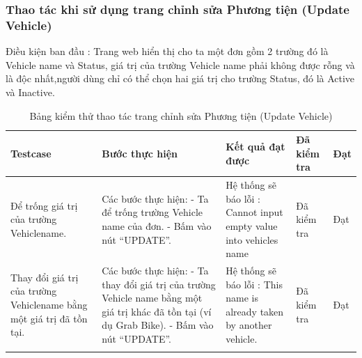 \documentclass[a4paper]{article}
\begin{document}
\subsubsection*{Thao tác khi sử dụng trang chỉnh sửa Phương tiện (Update Vehicle) }
Điều kiện ban đầu : Trang web hiển thị cho ta một đơn gồm 2 trường đó là Vehicle name và Status, giá trị của trường Vehicle name phải không được rỗng và là độc nhất,người dùng chỉ có thể chọn hai giá trị cho trường Status, đó là Active và Inactive.  \newline
\begin{longtable}{ | p{} |p{} | p{}  | p{}  | p{}  | } 
\hline
\textbf{Testcase}& \textbf{Bước thực hiện}& \textbf{Kết quả đạt được} & \textbf{Đã kiểm tra}& \textbf{Đạt} \\ 
\hline
\hline
Để trống giá trị của trường Vehiclename.  
&
Các bước thực hiện: \newline
- Ta để trống trường Vehicle name của đơn. \newline
- Bấm vào nút “UPDATE”.
&
Hệ thống sẽ báo lỗi : Cannot input empty value into vehicles name
&
Đã kiểm tra &
Đạt \\

\hline
Thay đổi giá trị của trường Vehiclename bằng một giá trị đã tồn tại.  
&
Các bước thực hiện: \newline
- Ta thay đổi giá trị của trường Vehicle name bằng một giá trị khác đã tồn tại (ví dụ Grab Bike). \newline
- Bấm vào nút “UPDATE”.
&
Hệ thống sẽ báo lỗi : This name is already taken by another vehicle.
&
Đã kiểm tra &
Đạt \\

\hline
\caption{Bảng kiểm thử thao tác trang chỉnh sửa Phương tiện (Update Vehicle)}
\end{longtable}

\end{document}
